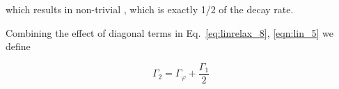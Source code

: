 {\begin{itemize}
 		\noindent which results in non-trivial  , which is
                exactly 1/2 of the decay rate.
              \end{itemize}
 
              Combining   the  effect   of   diagonal   terms  in   Eq.~\eqref{eq:linrelax_8},
              \eqref{eqn:lin_5} we define
  
  \begin{equation}\label{key}
    \Gamma_2 = \Gamma_{\varphi} + \frac{\Gamma_1}{2}
  \end{equation}
}
\newpage

